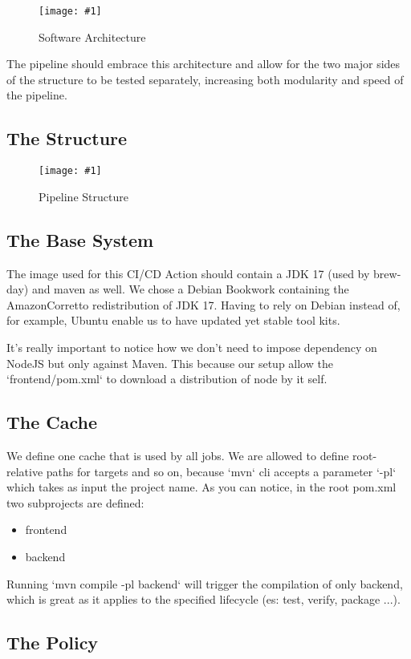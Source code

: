 \documentclass[a4paper,10pt]{scrartcl}
\newcommand{\putimage}[3] {
	\begin{figure}[H]
	    \centering
	    \texttt{[image: \#1]}
	    \caption{#2}\label{#3}
	\end{figure}
}
\begin{document}
\putimage{Arch.png}{Software Architecture}{fig:arch}

The pipeline should embrace this architecture and allow for the two major sides of the structure to be tested separately, increasing both modularity and speed of the pipeline.

\subsection{The Structure}

\putimage{Pipeline.png}{Pipeline Structure}{fig:arch}

\subsection{The Base System}

The image used for this CI/CD Action should contain a JDK 17 (used by brew-day) and maven as well. We chose a Debian Bookwork containing the AmazonCorretto redistribution of JDK 17. Having to rely on Debian instead of, for example, Ubuntu enable us to have updated yet stable tool kits.

It's really important to notice how we don't need to impose dependency on NodeJS but only against Maven. This because our setup allow the `frontend/pom.xml` to download a distribution of node by it self.

\subsection{The Cache}

We define one cache that is used by all jobs. We are allowed to define root-relative paths for targets and so on, because `mvn` cli accepts a parameter `-pl` which takes as input the project name. As you can notice, in the root pom.xml two subprojects are defined:

\begin{itemize}
    \item frontend
    \item backend
\end{itemize}

Running `mvn compile -pl backend` will trigger the compilation of only backend, which is great as it applies to the specified lifecycle (es: test, verify, package ...).

\subsection{The Policy}
\end{document}
